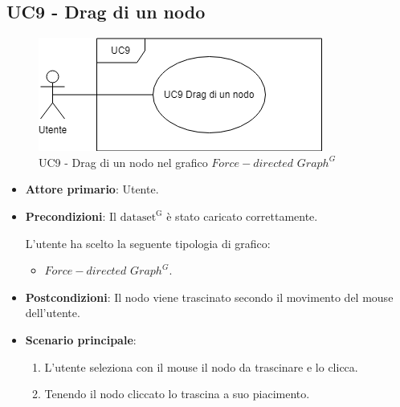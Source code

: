 \newpage


\subsection{UC9 - Drag di un nodo}
\label{sec:UC9}
\begin{figure}[h!]
    \centering
    \includegraphics[scale=0.60]{../../assets/drag_nodo.png}
    \caption{UC9 - Drag di un nodo nel grafico $Force-directed$ $Graph^{G}$}
\end{figure}
\begin{itemize}
    \item \textbf{Attore primario}: Utente.
    \item \textbf{Precondizioni}: Il ${\mathrm{dataset^{G}}}$ è stato caricato correttamente. \par L'utente ha scelto la seguente tipologia di grafico:
    \begin{itemize}
    		\item $Force-directed$ $Graph^{G}$.
    \end{itemize}
    \item \textbf{Postcondizioni}: Il nodo viene trascinato secondo il movimento del mouse dell'utente.
    \item \textbf{Scenario principale}:
          \begin{enumerate}
              \item L'utente seleziona con il mouse il nodo da trascinare e lo clicca.
              \item Tenendo il nodo cliccato lo trascina a suo piacimento.
          \end{enumerate}
\end{itemize}

\newpage

